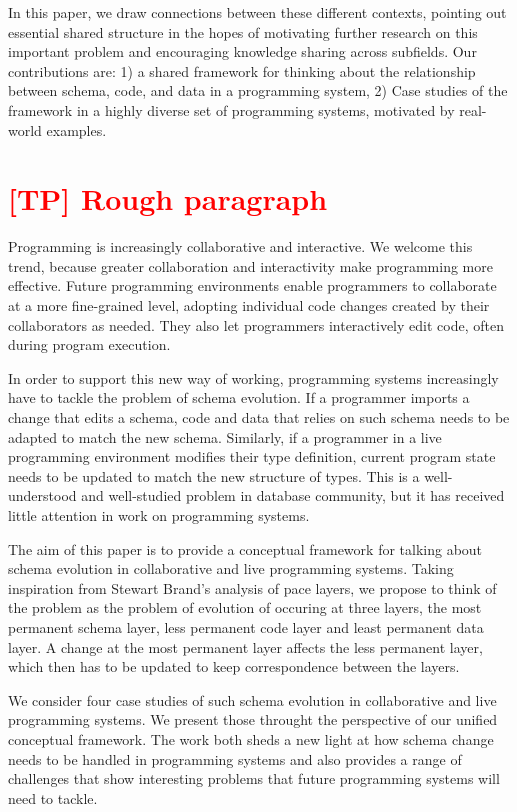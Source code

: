 \documentclass[english,submission]{programming}
\begin{document}
In this paper, we draw connections between these different contexts, pointing out essential shared structure in the hopes of motivating further research on this important problem and encouraging knowledge sharing across subfields. Our contributions are: 1) a shared framework for thinking about the relationship between schema, code, and data in a programming system, 2) Case studies of the framework in a highly diverse set of programming systems, motivated by real-world examples.


\section{\textcolor{red}{[TP] Rough paragraph}}

Programming is increasingly collaborative and interactive. We welcome this trend, because
greater collaboration and interactivity make programming more effective. Future programming
environments enable programmers to collaborate at a more fine-grained level, adopting individual
code changes created by their collaborators as needed. They also let programmers interactively
edit code, often during program execution.

In order to support this new way of working, programming systems increasingly have to tackle the
problem of schema evolution. If a programmer imports a change that edits a schema, code and data
that relies on such schema needs to be adapted to match the new schema. Similarly, if a programmer
in a live programming environment modifies their type definition, current program state needs to
be updated to match the new structure of types. This is a well-understood and well-studied problem
in database community, but it has received little attention in work on programming systems.

The aim of this paper is to provide a conceptual framework for talking about schema evolution in
collaborative and live programming systems. Taking inspiration from Stewart Brand's analysis of
pace layers, we propose to think of the problem as the problem of evolution of occuring at three
layers, the most permanent schema layer, less permanent code layer and least permanent data layer.
A change at the most permanent layer affects the less permanent layer, which then has to be
updated to keep correspondence between the layers.

We consider four case studies of such schema evolution in collaborative and live programming
systems. We present those throught the perspective of our unified conceptual framework. The work
both sheds a new light at how schema change needs to be handled in programming systems and also
provides a range of challenges that show interesting problems that future programming systems
will need to tackle.
\end{document}
